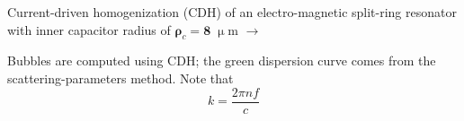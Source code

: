 \documentclass[t]{beamer} \usepackage[english]{babel} \usepackage[utf8]{inputenc} \usetheme{Frankfurt} %
\begin{document}
\begin{frame}[plain]{}%
\begin{columns}[T] %
	\begin{column}{.55\textwidth}
	\vspace{3mm}
	\noindent Current-driven homogenization (CDH) of an electro-magnetic split-ring resonator with inner capacitor radius of $\pmb\rho_c=\pmb 8\;\upmu$m $\rightarrow$
	\vspace{3mm}

	\noindent Bubbles are computed using CDH; the green dispersion curve comes from the scattering-parameters method. Note that $$k = \frac{2\pi n f}{c}$$
	\vspace{5mm}


\end{column}
\end{columns}
\end{frame}
\end{document}
